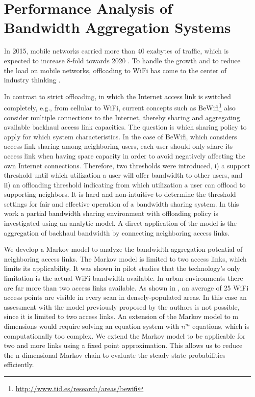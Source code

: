 \chapter{Performance Analysis of Bandwidth Aggregation Systems}\label{chap:aggregation}

In 2015, mobile networks carried more than 40 exabytes of traffic, which is expected to increase 8-fold towards 2020 \cite{cisco2016mobile}.
To handle the growth and to reduce the load on mobile networks, offloading to WiFi has come to the center of industry thinking \cite{wba2011wifi}.

In contrast to strict offloading, in which the Internet access link is switched completely, e.g., from cellular to WiFi, current concepts such as BeWifi\footnote{\url{http://www.tid.es/research/areas/bewifi}} also consider multiple connections to the Internet, thereby sharing and aggregating available backhaul access link capacities. The question is which sharing policy to apply for which system characteristics. In the case of BeWifi, which considers access link sharing among neighboring users, each user should only share its access link when having spare capacity in order to avoid negatively affecting the own Internet connections. Therefore, two thresholds were introduced, i) a support threshold until which utilization a user will offer bandwidth to other users, and ii) an offloading threshold indicating from which utilization a user can offload to supporting neighbors.
It is hard and non-intuitive to determine the threshold settings for fair and effective operation of a bandwidth sharing system.
In this work a partial bandwidth sharing environment with offloading policy is investigated using an analytic model.
A direct application of the model is the aggregation of backhaul bandwidth by connecting neighboring access links.

We develop a Markov model to analyze the bandwidth aggregation potential of neighboring access links.
The Markov model is limited to two access links, which limits its applicability.
It was shown in pilot studies that the technology's only limitation is the actual WiFi bandwidth available.
In urban environments there are far more than two access links available.
As shown in \cite{sapiezynski2015tracking}, an average of 25 WiFi access points are visible in every scan in densely-populated areas.
In this case an assessment with the model previously proposed by the authors is not possible, since it is limited to two access links.
An extension of the Markov model to m dimensions would require solving an equation system with $n^m$ equations, which is computationally too complex.
We extend the Markov model to be applicable for two and more links using a fixed point approximation.
This allows us to reduce the n-dimensional Markov chain to evaluate the steady state probabilities efficiently.

